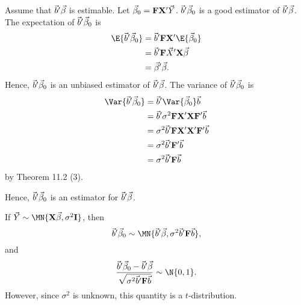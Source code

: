 \begin{Remark}{}{}
    Assume that $ \vec{b}'\vec{\beta} $ is estimable. Let
    $ \vec{\beta}_0=\mathbf{F}\mathbf{X}'\vec{Y} $.
    $ \vec{b}'\vec{\beta}_0 $ is a good estimator of $ \vec{b}'\vec{\beta} $.
    \tcblower{}
    The expectation of $ \vec{b}'\vec{\beta}_0 $ is
    \begin{align*}
        \E{\Vector{b}'\Vector{\beta}_0}
         & =\Vector{b}'\Matrix{F}\Matrix{X}'\E{\Vector{\beta}_0}     \\
         & =\Vector{b}'\Matrix{F}\Vector{X}'\Matrix{X}\Vector{\beta} \\
         & =\Vector{\beta}'\Vector{\beta}.
    \end{align*}
    Hence, $ \vec{b}'\vec{\beta}_0 $ is an unbiased estimator of $ \vec{b}'\vec{\beta} $.
    The variance of $ \vec{b}'\vec{\beta}_0 $ is
    \begin{align*}
        \Var{\Vector{b}'\Vector{\beta}_0}
         & =\Vector{b}'\Var{\Vector{\beta}_0}\Vector{b}                               \\
         & =\Vector{b}'\sigma^2 \Matrix{F}\Matrix{X}'\Matrix{X}\Matrix{F}'\Vector{b}  \\
         & =\sigma^2 \Vector{b}'\Matrix{F}\Matrix{X}'\Matrix{X}'\Matrix{F}'\Vector{b} \\
         & =\sigma^2 \Vector{b}'\Matrix{F}'\Vector{b}                                 \\
         & =\sigma^2 \Vector{b}'\Matrix{F}\Vector{b}
    \end{align*}
    by Theorem 11.2 (3).

    Hence, $ \vec{b}'\vec{\beta}_0 $ is an estimator for $ \vec{b}'\vec{\beta} $.
\end{Remark}
\begin{Theorem}{}{}
    If $ \Vector{Y} \sim \MN{\Matrix{X}\Vector{\beta},\sigma^2\Matrix{I}} $,
    then
    \[ \Vector{b}'\Vector{\beta}_0 \sim \MN{\Vector{b}'\Vector{\beta},
            \sigma^2\Vector{b}'\Matrix{F}\Vector{b}}, \]
    and
    \[ \frac{\Vector{b}'\Vector{\beta}_0-\Vector{b}'\Vector{\beta}}{\sqrt{\sigma^2\Vector{b}'\Matrix{F}\Vector{b}}}
        \sim \N{0,1}. \]
    However, since $ \sigma^2 $ is unknown, this quantity is a $ t $-distribution.
\end{Theorem}